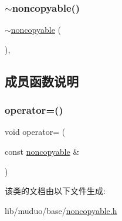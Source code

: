 \mbox{\label{classmuduo_1_1noncopyable_a60dec0098f04c2bedcf32fc41e8bd203}} 
\subsubsection{\texorpdfstring{$\sim$noncopyable()}{~noncopyable()}}
{\footnotesize\ttfamily $\sim$\hyperlink{classmuduo_1_1noncopyable}{noncopyable} (\begin{DoxyParamCaption}{ }\end{DoxyParamCaption})\hspace{0.3cm}{\ttfamily [protected]}, {\ttfamily [default]}}



\subsection{成员函数说明}
\mbox{\label{classmuduo_1_1noncopyable_adfca16bbe6126971c0c9959e573df923}} 
\subsubsection{\texorpdfstring{operator=()}{operator=()}}
{\footnotesize\ttfamily void operator= (\begin{DoxyParamCaption}\item[{const \hyperlink{classmuduo_1_1noncopyable}{noncopyable} \&}]{ }\end{DoxyParamCaption})\hspace{0.3cm}{\ttfamily [delete]}}



该类的文档由以下文件生成\+:\begin{DoxyCompactItemize}
\item 
lib/muduo/base/\hyperlink{noncopyable_8h}{noncopyable.\+h}\end{DoxyCompactItemize}
